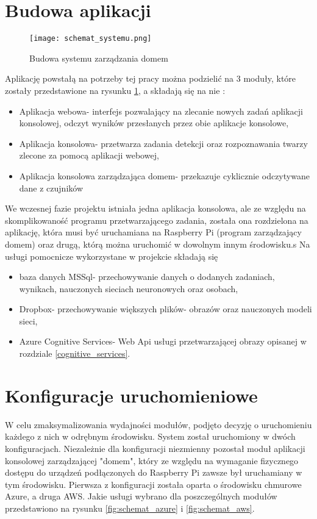 \section{Budowa aplikacji}
\begin{figure}[H]
	\centering
	\texttt{[image: schemat\_systemu.png]}
	\caption{Budowa systemu zarządzania domem}
	\label{fig:schemat_systemu}
\end{figure}
Aplikację powstałą na potrzeby tej pracy można podzielić na 3 moduły, które zostały przedstawione na rysunku \ref{fig:schemat_systemu}, a składają się na nie :
\begin{itemize}
\item Aplikacja webowa- interfejs pozwalający na zlecanie nowych zadań aplikacji konsolowej, odczyt wyników przesłanych przez obie aplikacje konsolowe,
\item Aplikacja konsolowa- przetwarza zadania detekcji oraz rozpoznawania twarzy zlecone za pomocą aplikacji webowej,
\item Aplikacja konsolowa zarządzająca domem- przekazuje cyklicznie odczytywane dane z czujników %
\end{itemize}
We wczesnej fazie projektu istniała jedna aplikacja konsolowa, ale ze względu na skomplikowaność programu przetwarzającego zadania, została ona rozdzielona na aplikację, która musi być uruchamiana na Raspberry Pi (program zarządzający domem) oraz drugą, którą można uruchomić w dowolnym innym środowisku.s
Na usługi pomocnicze wykorzystane w projekcie składają się
\begin{itemize}
\item baza danych MSSql- przechowywanie danych o dodanych zadaniach, wynikach, nauczonych sieciach neuronowych oraz osobach,
\item Dropbox- przechowywanie większych plików- obrazów oraz nauczonych modeli sieci,
\item Azure Cognitive Services- Web Api usługi przetwarzającej obrazy opisanej w rozdziale \ref{cognitive_services}.
\end{itemize}

\section{Konfiguracje uruchomieniowe}
W celu zmaksymalizowania wydajności modułów, podjęto decyzję o uruchomieniu każdego z nich w odrębnym środowisku. System został uruchomiony w dwóch konfiguracjach. Niezależnie dla konfiguracji niezmienny pozostał moduł aplikacji konsolowej zarządzającej "domem", który ze względu na wymaganie fizycznego dostępu do urządzeń podłączonych do Raspberry Pi zawsze był uruchamiany w tym środowisku.
Pierwsza z konfiguracji została oparta o środowisku chmurowe Azure, a druga AWS. Jakie usługi wybrano dla poszczególnych modułów przedstawiono na rysunku \ref{fig:schemat_azure} i \ref{fig:schemat_aws}.

